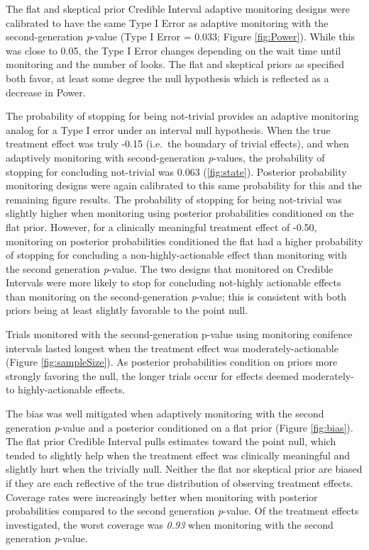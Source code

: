 \documentclass[12pt,oneside]{book}
\newlength{\li}\setlength{\li}{14.48pt}
\newlength{\di}\setlength{\di}{-3.5mm}
\theoremstyle{definition}
\theoremstyle{definition}
\theoremstyle{definition}
\theoremstyle{remark}
\begin{document}
The flat and skeptical prior Credible Interval adaptive monitoring
designs were calibrated to have the same Type I Error as adaptive
monitoring with the second-generation \emph{p}-value (Type I Error =
0.033; Figure \ref{fig:Power}). While this was close to 0.05, the Type I
Error changes depending on the wait time until monitoring and the number
of looks. The flat and skeptical priors as specified both favor, at
least some degree the null hypothesis which is reflected as a decrease
in Power.

The probability of stopping for being not-trivial provides an adaptive
monitoring analog for a Type I error under an interval null hypothesis.
When the true treatment effect was truly -0.15 (i.e.~the boundary of
trivial effects), and when adaptively monitoring with second-generation
\emph{p}-values, the probability of stopping for concluding not-trivial
was 0.063 (\ref{fig:state}). Posterior probability monitoring designs
were again calibrated to this same probability for this and the
remaining figure results. The probability of stopping for being
not-trivial was slightly higher when monitoring using posterior
probabilities conditioned on the flat prior. However, for a clinically
meaningful treatment effect of -0.50, monitoring on posterior
probabilities conditioned the flat had a higher probability of stopping
for concluding a non-highly-actionable effect than monitoring with the
second generation \emph{p}-value. The two designs that monitored on
Credible Intervals were more likely to stop for concluding not-highly
actionable effects than monitoring on the second-generation
\emph{p}-value; this is consistent with both priors being at least
slightly favorable to the point null.

Trials monitored with the second-generation p-value using monitoring
conifence intervals lasted longest when the treatment effect was
moderately-actionable (Figure \ref{fig:sampleSize}). As posterior
probabilities condition on priors more strongly favoring the null, the
longer trials occur for effects deemed moderately- to highly-actionable
effects.

The bias was well mitigated when adaptively monitoring with the second
generation \emph{p}-value and a posterior conditioned on a flat prior
(Figure \ref{fig:bias}). The flat prior Credible Interval pulls
estimates toward the point null, which tended to slightly help when the
treatment effect was clinically meaningful and slightly hurt when the
trivially null. Neither the flat nor skeptical prior are biased if they
are each reflective of the true distribution of observing treatment
effects. Coverage rates were increasingly better when monitoring with
posterior probabilities compared to the second generation
\emph{p}-value. Of the treatment effects investigated, the worst
coverage was \emph{0.93} when monitoring with the second generation
\emph{p}-value.
\end{document}
